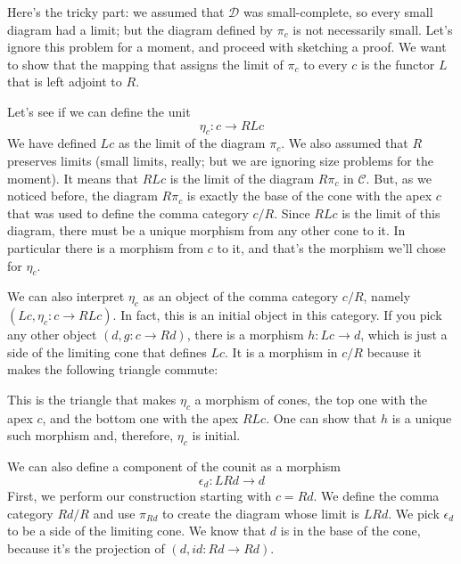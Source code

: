 \documentclass[11pt]{amsart}
\newcommand{\cat}[1]{\mathcal{#1}}
\begin{document}
Here's the tricky part: we assumed that $\cat D$ was small-complete, so every small diagram had a limit; but the diagram defined by $\pi_c$ is not necessarily small. Let's ignore this problem for a moment, and proceed with sketching a proof. We want to show that the mapping that assigns the limit of $\pi_c$ to every $c$ is the functor $L$ that is left adjoint to $R$. 

Let's see if we can define the unit
\[ \eta_c : c \to R L c\]
We have defined $L c$ as the limit of the diagram $\pi_c$. We also assumed that $R$ preserves limits (small limits, really; but we are ignoring size problems for the moment). It means that $R L c$ is the limit of the diagram $R \pi_c$ in $\cat C$. But, as we noticed before, the diagram  $R \pi_c$ is exactly the base of the cone with the apex $c$ that was used to define the comma category $c/R$. Since $R L c$ is the limit of this diagram, there must be a unique morphism from any other cone to it. In particular there is a morphism from $c$ to it, and that's the morphism we'll chose for $\eta_c$. 

We can also interpret $\eta_c$ as an object of the comma category $c/R$, namely $(Lc, \eta_c \colon c \to R L c)$. In fact, this is an initial object in this category. If you pick any other object $(d, g \colon c \to R d)$, there is a morphism $h \colon L c \to d$, which is just a side of the limiting cone that defines $L c$. It is a morphism in $c/R$ because it makes the following triangle commute:

\begin{figure}[H]
\centering
\end{figure}
This is the triangle that makes $\eta_c$ a morphism of cones, the top one with the apex $c$, and the bottom one with the apex $R L c$. One can show that $h$ is a unique such morphism and, therefore, $\eta_c$ is initial.

We can also define a component of the counit as a morphism
\[\epsilon_d : L R d \to d \]
First, we perform our construction starting with $c = R d$. We define the comma category $R d / R$ and use $\pi_{R d}$ to create the diagram whose limit is $L R d$. We pick $\epsilon_d$ to be a side of the limiting cone. We know that $d$ is in the base of the cone, because it's the projection of $(d, id \colon R d \to R d)$. 
\end{document}

